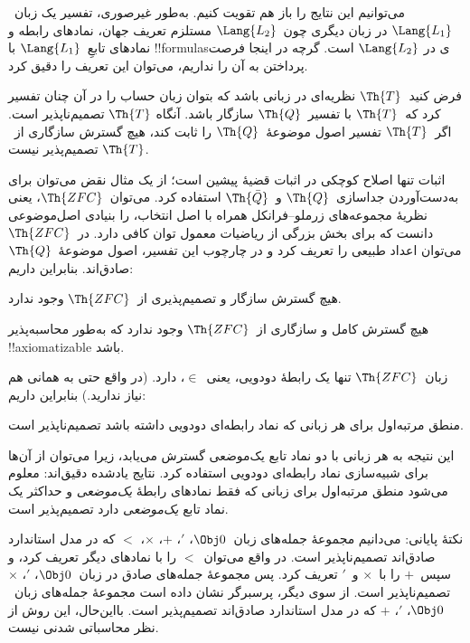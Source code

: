\documentclass[../../../include/open-logic-section]{subfiles}
\begin{document}


می‌توانیم این نتایج را باز هم تقویت کنیم. به‌طور غیرصوری، تفسیر یک
زبان~$\Lang{L_1}$ در زبان دیگری چون~$\Lang{L_2}$ مستلزم تعریف جهان،
نمادهای رابطه و نمادهای تابعِ~$\Lang{L_1}$ با !!{formula}sی در
$\Lang{L_2}$ است. گرچه در اینجا فرصت پرداختن به آن را نداریم، می‌توان
این تعریف را دقیق کرد.

\begin{thm}
  فرض کنید~$\Th{T}$ نظریه‌ای در زبانی باشد که بتوان زبان حساب را در آن
  چنان تفسیر کرد که~$\Th{T}$ با تفسیر~$\Th{Q}$ سازگار باشد. آنگاه
  $\Th{T}$ تصمیم‌ناپذیر است. اگر~$\Th{T}$ تفسیر اصول موضوعهٔ~$\Th{Q}$
  را ثابت کند، هیچ گسترش سازگاری از~$\Th{T}$ تصمیم‌پذیر نیست.
\end{thm}

اثبات تنها اصلاح کوچکی در اثبات قضیهٔ پیشین است؛ از یک مثال نقض می‌توان
برای به‌دست‌آوردن جداسازی~$\Th{Q}$ و~$\Th{\bar Q}$ استفاده کرد.
می‌توان~$\Th{ZFC}$، یعنی نظریهٔ مجموعه‌های زرملو--فرانکل همراه با اصل
انتخاب، را بنیادی اصل‌موضوعی دانست که برای بخش بزرگی از ریاضیات معمول
توان کافی دارد. در~$\Th{ZFC}$ می‌توان اعداد طبیعی را تعریف کرد و در
چارچوب این تفسیر، اصول موضوعهٔ~$\Th{Q}$ صادق‌اند. بنابراین داریم:

\begin{cor}
هیچ گسترش سازگار و تصمیم‌پذیری از~$\Th{ZFC}$ وجود ندارد.
\end{cor}

\begin{cor}
هیچ گسترش کامل و سازگاری از~$\Th{ZFC}$ وجود ندارد که به‌طور
محاسبه‌پذیر !!{axiomatizable} باشد.
\end{cor}

زبان~$\Th{ZFC}$ تنها یک رابطهٔ دودویی، یعنی~$\in$، دارد. (در واقع حتی
به همانی هم نیاز ندارید.) بنابراین داریم:

\begin{cor}
منطق مرتبه‌اول برای هر زبانی که نماد رابطه‌ای دودویی داشته باشد
تصمیم‌ناپذیر است.
\end{cor}

این نتیجه به هر زبانی با دو نماد تابع یک‌موضعی گسترش می‌یابد، زیرا
می‌توان از آن‌ها برای شبیه‌سازی نماد رابطه‌ای دودویی استفاده کرد. نتایج
یادشده دقیق‌اند: معلوم می‌شود منطق مرتبه‌اول برای زبانی که فقط نمادهای
رابطهٔ \emph{یک‌موضعی} و حداکثر یک نماد تابع \emph{یک‌موضعی} دارد
تصمیم‌پذیر است.

نکتهٔ پایانی: می‌دانیم مجموعهٔ جمله‌های زبان~$\Obj 0$، $'$، $+$،
$\times$، $<$ که در مدل استاندارد صادق‌اند تصمیم‌ناپذیر است. در واقع
می‌توان~$<$ را با نمادهای دیگر تعریف کرد، و سپس~$+$ را با~$\times$
و~$'$ تعریف کرد. پس مجموعهٔ جمله‌های صادق در زبان~$\Obj 0$، $'$،
$\times$ تصمیم‌ناپذیر است. از سوی دیگر، پرسبرگر نشان داده است مجموعهٔ
جمله‌های زبان~$\Obj 0$، $'$، $+$ که در مدل استاندارد صادق‌اند تصمیم‌پذیر
است. بااین‌حال، این روش از نظر محاسباتی شدنی نیست.
\end{document}
